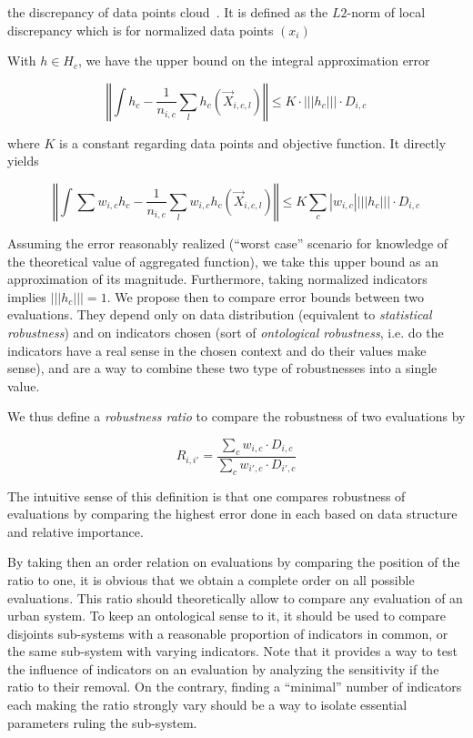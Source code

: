 \documentclass[runningheads,a4paper]{llncs2e/llncs}
\begin{document}
the discrepancy of data points cloud~\cite{niederreiter1972discrepancy}. It is defined as the $L2$-norm of local discrepancy which is for normalized data points $(x_i)$

With $h\in H_{c}$, we have the upper bound on the integral approximation error

\[
\left\Vert \int h_{c}-\frac{1}{n_{i,c}}\sum_{l}h_{c}(\vec{X}_{i,c,l})\right\Vert \leq K\cdot\left|\left|\left|h_{c}\right|\right|\right|\cdot D_{i,c}
\]

where $K$ is a constant regarding data points and objective function. It directly yields

\[
\left\Vert \int\sum w_{i,c}h_{c}-\frac{1}{n_{i,c}}\sum_{l}w_{i,c}h_{c}(\vec{X}_{i,c,l})\right\Vert \leq K\sum_{c}\left|w_{i,c}\right|\left|\left|\left|h_{c}\right|\right|\right|\cdot D_{i,c}
\]

Assuming the error reasonably realized (``worst case'' scenario for knowledge of the theoretical value of aggregated function), we take this upper bound as an approximation of its magnitude. Furthermore, taking normalized indicators implies $\left|\left|\left|h_c\right|\right|\right| = 1$. We propose then to compare error bounds between two evaluations. They depend only on data distribution (equivalent to \emph{statistical robustness}) and on indicators chosen (sort of \emph{ontological robustness}, i.e. do the indicators have a real sense in the chosen context and do their values make sense), and are a way to combine these two type of robustnesses into a single value.

We thus define a \emph{robustness ratio} to compare the robustness of two evaluations by

\begin{equation}
R_{i,i'}=\frac{\sum_{c}w_{i,c}\cdot D_{i,c}}{\sum_{c}w_{i',c}\cdot D_{i',c}}
\end{equation}


The intuitive sense of this definition is that one compares robustness of evaluations by comparing the highest error done in each based on data structure and relative importance.


By taking then an order relation on evaluations by comparing the position of the ratio to one, it is obvious that we obtain a complete order on all possible evaluations. This ratio should theoretically allow to compare any evaluation of an urban system. To keep an ontological sense to it, it should be used to compare disjoints sub-systems with a reasonable proportion of indicators in common, or the same sub-system with varying indicators. Note that it provides a way to test the influence of indicators on an evaluation by analyzing the sensitivity if the ratio to their removal. On the contrary, finding a ``minimal'' number of indicators each making the ratio strongly vary should be a way to isolate essential parameters ruling the sub-system.
\end{document}
